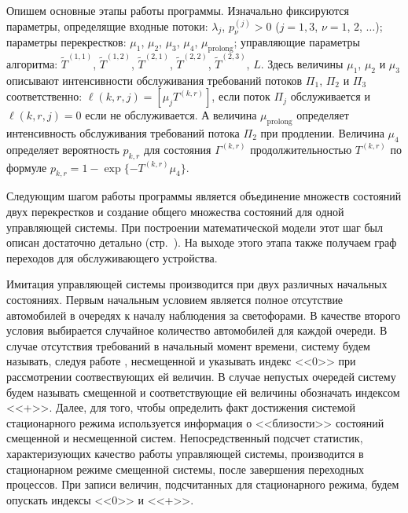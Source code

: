 Опишем основные этапы работы программы. Изначально фиксируются параметры, определящие входные потоки:
$\lambda_j$,  $p_{\nu}^{(j)}>0$ ($j=1,3$, $\nu=1$, $2$, $\ldots$); параметры перекрестков: $\mu_1$, $\mu_2$,  $\mu_3$, $\mu_4$, $\mu_{\mathrm{prolong}}$; управляющие параметры алгоритма: $\widetilde T^{(1,1)}$, $\widetilde T^{(1,2)}$, $\widetilde T^{(2,1)}$, $\widetilde T^{(2,2)}$, $\widetilde T^{(2,3)}$, $L$. Здесь величины $\mu_1$, $\mu_2$ и $\mu_3$  описывают интенсивности обслуживания требований потоков $\Pi_1$, $\Pi_2$ и $\Pi_3$ соответственно: $\ell(k,r,j)=[\mu_j T^{(k,r)}]$, если  поток $\Pi_j$ обслуживается и $\ell(k,r,j)=0$ если не обслуживается. А величина $\mu_{\mathrm{prolong}}$ определяет интенсивность обслуживания требований потока $\Pi_2$ при продлении. Величина $\mu_4$ определяет вероятность $p_{k,r}$ для состояния $\Gamma^{(k,r)}$ продолжительностью $T^{(k,r)}$ по формуле $p_{k,r} = 1- \exp{\{- T^{(k,r)} \mu_4\}}$.  


Следующим шагом работы программы является объединение множеств состояний двух перекрестков и создание общего множества состояний для одной управляющей системы. При построении математической модели этот шаг был описан достаточно детально (стр.~\pageref{SystemStates}). На выходе этого этапа также получаем граф переходов для обслуживающего устройства.

Имитация управляющей системы производится при двух различных начальных состояниях. Первым начальным условием является полное отсутствие автомобилей в очередях к началу наблюдения за светофорами. В качестве второго условия выбирается случайное количество автомобилей для каждой очереди. В случае отсутствия требований в начальный момент времени, систему будем называть, следуя работе \cite{FedotkinRachinskaya:2016}, несмещенной и указывать индекс <<0>> при рассмотрении соотвествующих ей величин. В случае непустых очередей систему будем называть смещенной и соответствующие ей величины обозначать индексом <<+>>. Далее, для того, чтобы определить факт достижения системой стационарного режима используется информация о <<близости>> состояний смещенной и несмещенной систем. Непосредственный подсчет статистик, характеризующих качество работы управляющей системы, производится в стационарном режиме смещенной системы, после завершения переходных процессов. При записи величин, подсчитанных для стационарного режима, будем опускать индексы <<0>> и <<+>>.

